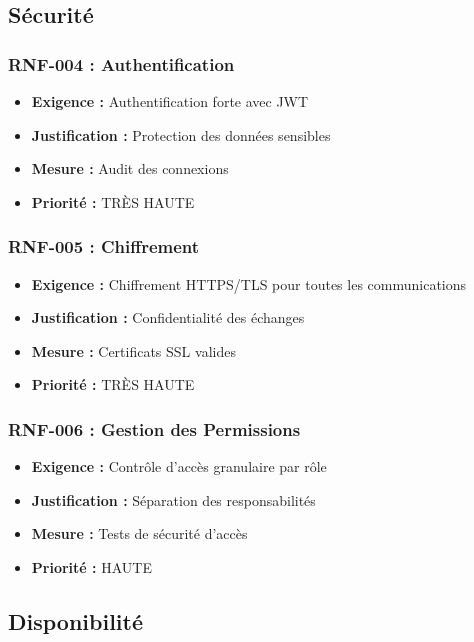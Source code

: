 \subsection{Sécurité}

\subsubsection{RNF-004 : Authentification}
\begin{itemize}
    \item \textbf{Exigence :} Authentification forte avec JWT
    \item \textbf{Justification :} Protection des données sensibles
    \item \textbf{Mesure :} Audit des connexions
    \item \textbf{Priorité :} TRÈS HAUTE
\end{itemize}

\subsubsection{RNF-005 : Chiffrement}
\begin{itemize}
    \item \textbf{Exigence :} Chiffrement HTTPS/TLS pour toutes les communications
    \item \textbf{Justification :} Confidentialité des échanges
    \item \textbf{Mesure :} Certificats SSL valides
    \item \textbf{Priorité :} TRÈS HAUTE
\end{itemize}

\subsubsection{RNF-006 : Gestion des Permissions}
\begin{itemize}
    \item \textbf{Exigence :} Contrôle d'accès granulaire par rôle
    \item \textbf{Justification :} Séparation des responsabilités
    \item \textbf{Mesure :} Tests de sécurité d'accès
    \item \textbf{Priorité :} HAUTE
\end{itemize}

\subsection{Disponibilité}


